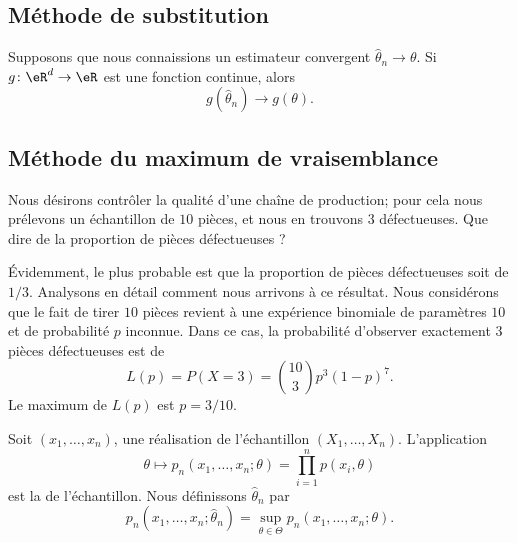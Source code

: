 \subsection{Méthode de substitution}

Supposons que nous connaissions un estimateur convergent \( \hat\theta_n\to\theta\). Si \( g\colon \eR^d\to \eR\) est une fonction continue, alors
\begin{equation}
    g(\hat\theta_n)\to g(\theta).
\end{equation}

\subsection{Méthode du maximum de vraisemblance}

\begin{example}     \label{ExVrasMaxLp}
    Nous désirons contrôler la qualité d'une chaîne de production; pour cela nous prélevons un échantillon de \( 10\) pièces, et nous en trouvons \( 3\) défectueuses. Que dire de la proportion de pièces défectueuses ?

    Évidemment, le plus probable est que la proportion de pièces défectueuses soit de \( 1/3\). Analysons en détail comment nous arrivons à ce résultat. Nous considérons que le fait de tirer \( 10\) pièces revient à une expérience binomiale de paramètres \( 10\) et de probabilité \( p\) inconnue. Dans ce cas, la probabilité d'observer exactement \( 3\) pièces défectueuses est de 
    \begin{equation}
        L(p)=P(X=3)={10\choose 3}p^3(1-p)^{7}.
    \end{equation}
    Le maximum de \( L(p)\) est \( p=3/10\).

    \newcommand{\CaptionFigMaxVraissLp}{La fonction de vraisemblance de l'exemple \ref{ExVrasMaxLp}.}
    
\end{example}

Soit \( (x_1,\ldots,x_n)\), une réalisation de l'échantillon \( (X_1,\ldots,X_n)\). L'application
\begin{equation}
    \theta\mapsto p_n(x_1,\ldots,x_n;\theta)=\prod_{i=1}^np(x_i,\theta)
\end{equation}
est la  de l'échantillon. Nous définissons \( \hat\theta_n\) par
\begin{equation}
    p_n(x_1,\dots,x_n;\hat\theta_n)=\sup_{\theta\in\Theta}p_n(x_1,\ldots,x_n;\theta).
\end{equation}

